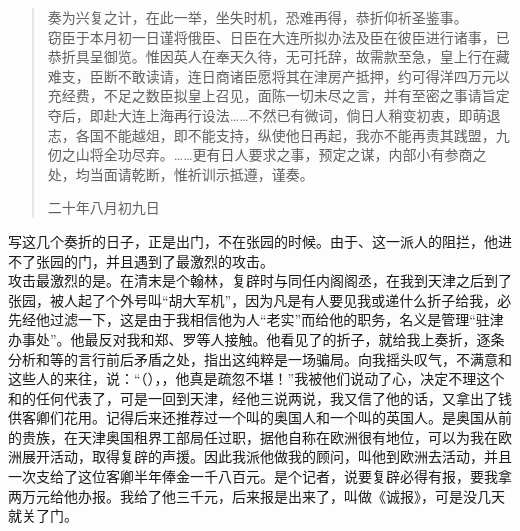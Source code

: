\begin{quote}
奏为兴复之计，在此一举，坐失时机，恐难再得，恭折仰祈圣鉴事。\\

窃臣于本月初一日谨将俄臣、日臣在大连所拟办法及臣在彼臣进行诸事，已恭折具呈御览。惟因英人在奉天久待，无可托辞，故需款至急，皇上行在藏难支，臣断不敢读请，连日商诸臣愿将其在津房产抵押，约可得洋四万元以充经费，不足之数臣拟皇上召见，面陈一切未尽之言，并有至密之事请旨定夺后，即赴大连上海再行设法……不然已有微词，倘日人稍变初衷，即萌退志，各国不能越俎，即不能支持，纵使他日再起，我亦不能再责其践盟，九仞之山将全功尽弃。……更有日人要求之事，预定之谋，内部小有参商之处，均当面请乾断，惟祈训示抵遵，谨奏。\\

\begin{flushright}
	二十年八月初九日\\
\end{flushright}
\end{quote}

写这几个奏折的日子，正是出门，不在张园的时候。由于、这一派人的阻拦，他进不了张园的门，并且遇到了最激烈的攻击。\\

攻击最激烈的是。在清末是个翰林，复辟时与同任内阁阁丞，在我到天津之后到了张园，被人起了个外号叫“胡大军机”，因为凡是有人要见我或递什么折子给我，必先经他过滤一下，这是由于我相信他为人“老实”而给他的职务，名义是管理“驻津办事处”。他最反对我和郑、罗等人接触。他看见了的折子，就给我上奏折，逐条分析和等的言行前后矛盾之处，指出这纯粹是一场骗局。向我摇头叹气，不满意和这些人的来往，说：“（），，他真是疏忽不堪！”我被他们说动了心，决定不理这个和的任何代表了，可是一回到天津，经他三说两说，我又信了他的话，又拿出了钱供客卿们花用。记得后来还推荐过一个叫的奥国人和一个叫的英国人。是奥国从前的贵族，在天津奥国租界工部局任过职，据他自称在欧洲很有地位，可以为我在欧洲展开活动，取得复辟的声援。因此我派他做我的顾问，叫他到欧洲去活动，并且一次支给了这位客卿半年俸金一千八百元。是个记者，说要复辟必得有报，要我拿两万元给他办报。我给了他三千元，后来报是出来了，叫做《诚报》，可是没几天就关了门。\\

